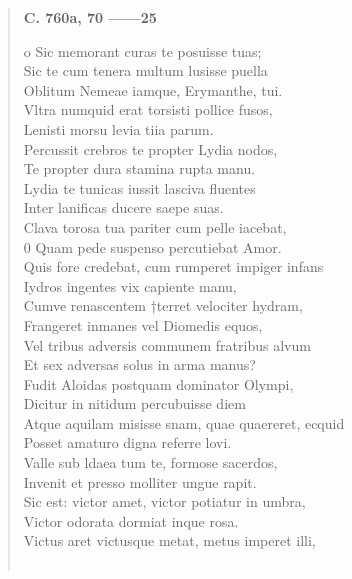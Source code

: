 \documentclass[11pt, a4paper]{report}
\begin{document}
\begin{verse}
    \begin{center} \textbf{C. 760a, 70 ——25} \end{center} \marginpar{[239]} o Sic memorant curas te posuisse tuas; \\ Sic te cum tenera multum lusisse puella \\ Oblitum Nemeae iamque, Erymanthe, tui. \\ Vltra numquid erat torsisti pollice fusos, \\ Lenisti morsu levia tiia parum. \\ Percussit crebros te propter Lydia nodos, \\ Te propter dura stamina rupta manu. \\ Lydia te tunicas iussit lasciva fluentes \\ Inter lanificas ducere saepe suas. \\ Clava torosa tua pariter cum pelle iacebat, \\ 0 Quam pede suspenso percutiebat Amor. \\ Quis fore credebat, cum rumperet impiger infans \\ Iydros ingentes vix capiente manu, \\ Cumve renascentem †terret velociter hydram, \\ Frangeret inmanes vel Diomedis equos, \\ Vel tribus adversis communem fratribus alvum \\ Et sex adversas solus in arma manus? \\ Fudit Aloidas postquam dominator Olympi, \\ Dicitur in nitidum percubuisse diem \\ Atque aquilam misisse snam, quae quaereret, ecquid \\ Posset amaturo digna referre lovi. \\ Valle sub ldaea tum te, formose sacerdos, \\ Invenit et presso molliter ungue rapit. \\ Sic est: victor amet, victor potiatur in umbra, \\ Victor odorata dormiat inque rosa. \\ Victus aret victusque metat, metus imperet illi, \\ 
        ﻿\pagebreak 

\end{verse}
\end{document}
